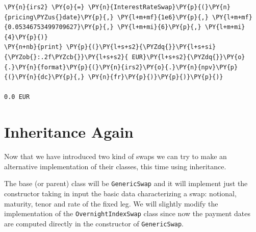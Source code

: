 \begin{tcolorbox}[breakable, size=fbox, boxrule=1pt, pad at break*=1mm,colback=cellbackground, colframe=cellborder]
\begin{Verbatim}[commandchars=\\\{\}]
\PY{n}{irs2} \PY{o}{=} \PY{n}{InterestRateSwap}\PY{p}{(}\PY{n}{pricing\PYZus{}date}\PY{p}{,} \PY{l+m+mf}{1e6}\PY{p}{,} \PY{l+m+mf}{0.05346753499709627}\PY{p}{,} \PY{l+m+mi}{6}\PY{p}{,} \PY{l+m+mi}{4}\PY{p}{)}
\PY{n+nb}{print} \PY{p}{(}\PY{l+s+s2}{\PYZdq{}}\PY{l+s+si}{\PYZob{}:.2f\PYZcb{}}\PY{l+s+s2}{ EUR}\PY{l+s+s2}{\PYZdq{}}\PY{o}{.}\PY{n}{format}\PY{p}{(}\PY{n}{irs2}\PY{o}{.}\PY{n}{npv}\PY{p}{(}\PY{n}{dc}\PY{p}{,} \PY{n}{fr}\PY{p}{)}\PY{p}{)}\PY{p}{)}

0.0 EUR
\end{Verbatim}
\end{tcolorbox}
    
\section{Inheritance Again}
Now that we have introduced two kind of swaps we can try to make an alternative implementation of their classes, this time using inheritance.

The base (or parent) class will be \texttt{GenericSwap} and it will implement just the constructor taking in input the basic data characterizing a swap: notional, maturity, tenor and rate of the fixed leg. We will slightly modify the implementation of the \texttt{OvernightIndexSwap} class since now the payment dates are computed directly in the constructor of \texttt{GenericSwap}.


